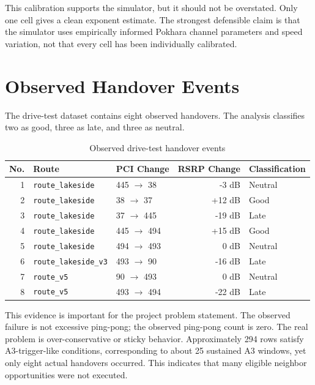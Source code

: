 \documentclass[12pt,a4paper]{report}
\begin{document}
This calibration supports the simulator, but it should not be overstated. Only one cell gives a clean exponent estimate. The strongest defensible claim is that the simulator uses empirically informed Pokhara channel parameters and speed variation, not that every cell has been individually calibrated.

\section{Observed Handover Events}
The drive-test dataset contains eight observed handovers. The analysis classifies two as good, three as late, and three as neutral.

\begin{table}[H]
\centering
\caption{Observed drive-test handover events}
\begin{tabularx}{\textwidth}{r p{}p{}r p{}}
\toprule
\textbf{No.} & \textbf{Route} & \textbf{PCI Change} & \textbf{RSRP Change} & \textbf{Classification}\\
\midrule
1 & \texttt{route\_lakeside} & 445 $\rightarrow$ 38 & -3 dB & Neutral\\
2 & \texttt{route\_lakeside} & 38 $\rightarrow$ 37 & +12 dB & Good\\
3 & \texttt{route\_lakeside} & 37 $\rightarrow$ 445 & -19 dB & Late\\
4 & \texttt{route\_lakeside} & 445 $\rightarrow$ 494 & +15 dB & Good\\
5 & \texttt{route\_lakeside} & 494 $\rightarrow$ 493 & 0 dB & Neutral\\
6 & \texttt{route\_lakeside\_v3} & 493 $\rightarrow$ 90 & -16 dB & Late\\
7 & \texttt{route\_v5} & 90 $\rightarrow$ 493 & 0 dB & Neutral\\
8 & \texttt{route\_v5} & 493 $\rightarrow$ 494 & -22 dB & Late\\
\bottomrule
\end{tabularx}
\end{table}

This evidence is important for the project problem statement. The observed failure is not excessive ping-pong; the observed ping-pong count is zero. The real problem is over-conservative or sticky behavior. Approximately 294 rows satisfy A3-trigger-like conditions, corresponding to about 25 sustained A3 windows, yet only eight actual handovers occurred. This indicates that many eligible neighbor opportunities were not executed.
\end{document}

